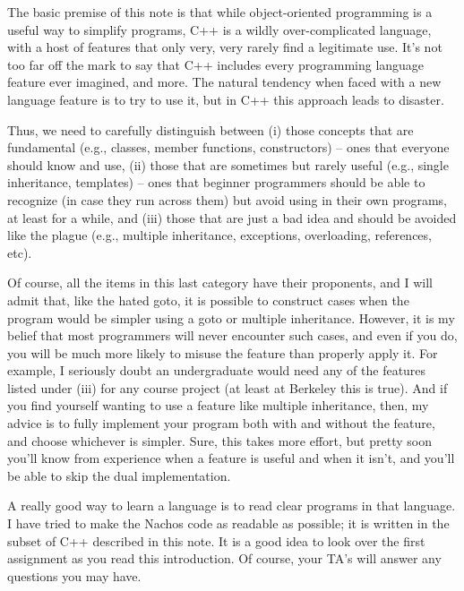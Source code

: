 The basic premise of this note is that while object-oriented
programming is a useful way to simplify programs, C++ is a wildly
over-complicated
language, with a host of features that only very, very rarely find a
legitimate use.  It's not too far off the mark to say that C++ includes
every programming language feature ever imagined, and more.
The natural tendency when faced with a new language feature
is to try to use it, but in C++ this approach leads to disaster.

Thus, we need to carefully distinguish between (i) those concepts 
that are fundamental (e.g., classes, member functions, constructors)
-- ones that everyone should know and use, (ii) those that are sometimes 
but rarely useful (e.g., single inheritance, templates) -- ones that
beginner programmers should be able to recognize (in case they run across
them) but avoid using in their own programs, at least for a while,
and (iii) those that are just a bad idea and should be avoided like
the plague (e.g., multiple inheritance, exceptions, overloading,
references, etc).

Of course, all the items in this last category have their proponents,
and I will admit that, like the hated goto, it is possible to
construct cases when the program would be simpler using a goto or
multiple inheritance.  However, it is
my belief that most programmers will never encounter such cases,
and even if you do, you will be much more likely to misuse the 
feature than properly apply it.
For example, I seriously doubt an undergraduate would need any of 
the features listed under (iii) for any course project (at least
at Berkeley this is true).  And if you find yourself wanting to use 
a feature like multiple inheritance, then, my advice is to fully 
implement your program both with and without the feature, and choose 
whichever is simpler.  Sure, this takes more effort, but
pretty soon you'll know from experience when a feature is useful and when
it isn't, and you'll be able to skip the dual implementation.

A really good way to learn a language is to read clear programs in that
language.  I have tried to make the Nachos code as readable as possible;
it is written in the subset of C++ described in this note.
It is a good idea to look over the first assignment as you read this
introduction.  Of course, your TA's will answer any questions you may
have.


